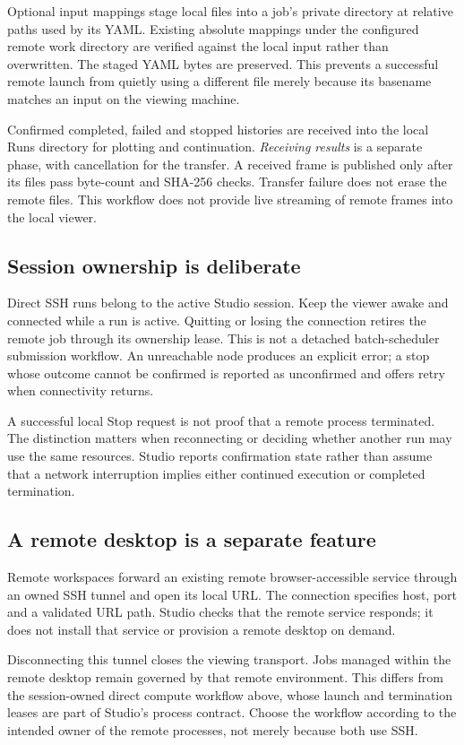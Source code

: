 Optional input mappings stage local files into a job's private directory at
relative paths used by its YAML. Existing absolute mappings under the configured
remote work directory are verified against the local input rather than
overwritten. The staged YAML bytes are preserved. This prevents a successful
remote launch from quietly using a different file merely because its basename
matches an input on the viewing machine.

Confirmed completed, failed and stopped histories are received into the local
Runs directory for plotting and continuation. \emph{Receiving results} is a
separate phase, with cancellation for the transfer. A received frame is published
only after its files pass byte-count and SHA-256 checks. Transfer failure does
not erase the remote files. This workflow does not provide live streaming of
remote frames into the local viewer.

\subsection{Session ownership is deliberate}
Direct SSH runs belong to the active Studio session. Keep the viewer awake and
connected while a run is active. Quitting or losing the connection retires the
remote job through its ownership lease. This is not a detached batch-scheduler
submission workflow. An unreachable node produces an explicit error; a stop
whose outcome cannot be confirmed is reported as unconfirmed and offers retry
when connectivity returns.

A successful local Stop request is not proof that a remote process terminated.
The distinction matters when reconnecting or deciding whether another run may
use the same resources. Studio reports confirmation state rather than assume
that a network interruption implies either continued execution or completed
termination.

\subsection{A remote desktop is a separate feature}
Remote workspaces forward an existing remote browser-accessible service through
an owned SSH tunnel and open its local URL. The connection specifies host, port
and a validated URL path. Studio checks that the remote service responds; it
does not install that service or provision a remote desktop on demand.

Disconnecting this tunnel closes the viewing transport. Jobs managed within the
remote desktop remain governed by that remote environment. This differs from
the session-owned direct compute workflow above, whose launch and termination
leases are part of Studio's process contract. Choose the workflow according to
the intended owner of the remote processes, not merely because both use SSH.

